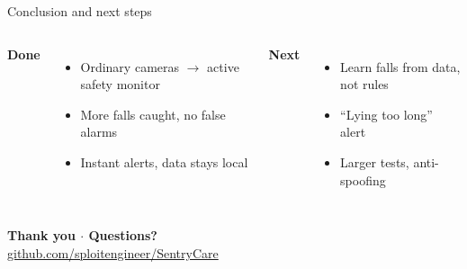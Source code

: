 \documentclass[aspectratio=169,11pt]{beamer}
\begin{document}
\begin{frame}{Conclusion and next steps}
\begin{columns}[c]
\textbf{Done}
\begin{itemize}\setlength\itemsep{0.6em}
  \item Ordinary cameras $\to$ active safety monitor
  \item More falls caught, no false alarms
  \item Instant alerts, data stays local
\end{itemize}
\textbf{Next}
\begin{itemize}\setlength\itemsep{0.6em}
  \item Learn falls from data, not rules
  \item ``Lying too long'' alert
  \item Larger tests, anti-spoofing
\end{itemize}
\end{columns}
\vspace{2.2em}
\centering
{\LARGE\bfseries\color{sentry} Thank you $\cdot$ Questions?}\\[0.6em]
\small\url{github.com/sploitengineer/SentryCare}
\end{frame}
\end{document}
